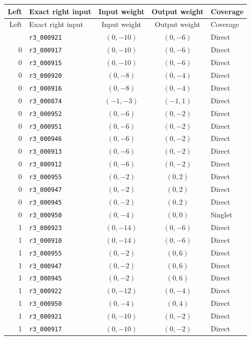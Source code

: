 \begingroup\small
\begin{longtable}{@{}rlccl@{}}
\toprule Left&Exact right input&Input weight&Output weight&Coverage\\\midrule\endfirsthead
\toprule Left&Exact right input&Input weight&Output weight&Coverage\\\midrule\endhead
\bottomrule\endfoot
0 & \texttt{r3\_000921} & $(0,-10)$ & $(0,-6)$ & Direct\\
0 & \texttt{r3\_000917} & $(0,-10)$ & $(0,-6)$ & Direct\\
0 & \texttt{r3\_000915} & $(0,-10)$ & $(0,-6)$ & Direct\\
0 & \texttt{r3\_000920} & $(0,-8)$ & $(0,-4)$ & Direct\\
0 & \texttt{r3\_000916} & $(0,-8)$ & $(0,-4)$ & Direct\\
0 & \texttt{r3\_000874} & $(-1,-3)$ & $(-1,1)$ & Direct\\
0 & \texttt{r3\_000952} & $(0,-6)$ & $(0,-2)$ & Direct\\
0 & \texttt{r3\_000951} & $(0,-6)$ & $(0,-2)$ & Direct\\
0 & \texttt{r3\_000946} & $(0,-6)$ & $(0,-2)$ & Direct\\
0 & \texttt{r3\_000913} & $(0,-6)$ & $(0,-2)$ & Direct\\
0 & \texttt{r3\_000912} & $(0,-6)$ & $(0,-2)$ & Direct\\
0 & \texttt{r3\_000955} & $(0,-2)$ & $(0,2)$ & Direct\\
0 & \texttt{r3\_000947} & $(0,-2)$ & $(0,2)$ & Direct\\
0 & \texttt{r3\_000945} & $(0,-2)$ & $(0,2)$ & Direct\\
0 & \texttt{r3\_000950} & $(0,-4)$ & $(0,0)$ & Singlet\\
1 & \texttt{r3\_000923} & $(0,-14)$ & $(0,-6)$ & Direct\\
1 & \texttt{r3\_000910} & $(0,-14)$ & $(0,-6)$ & Direct\\
1 & \texttt{r3\_000955} & $(0,-2)$ & $(0,6)$ & Direct\\
1 & \texttt{r3\_000947} & $(0,-2)$ & $(0,6)$ & Direct\\
1 & \texttt{r3\_000945} & $(0,-2)$ & $(0,6)$ & Direct\\
1 & \texttt{r3\_000922} & $(0,-12)$ & $(0,-4)$ & Direct\\
1 & \texttt{r3\_000950} & $(0,-4)$ & $(0,4)$ & Direct\\
1 & \texttt{r3\_000921} & $(0,-10)$ & $(0,-2)$ & Direct\\
1 & \texttt{r3\_000917} & $(0,-10)$ & $(0,-2)$ & Direct\\

\end{longtable}
